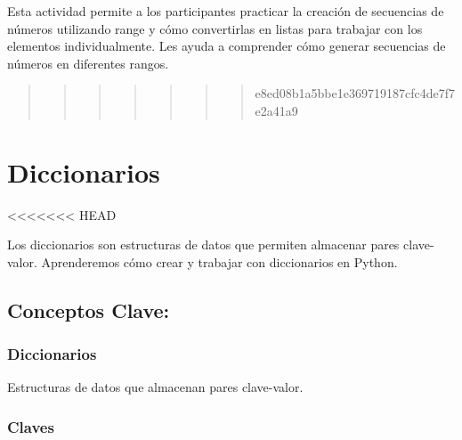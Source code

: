 \documentclass[
  a4paper,
  DIV=11,
  numbers=noendperiod,
  onepage,
  openany]{scrreprt}
\begin{document}
Esta actividad permite a los participantes practicar la creación de
secuencias de números utilizando range y cómo convertirlas en listas
para trabajar con los elementos individualmente. Les ayuda a comprender
cómo generar secuencias de números en diferentes rangos.

\begin{quote}
\begin{quote}
\begin{quote}
\begin{quote}
\begin{quote}
\begin{quote}
\begin{quote}
e8ed08b1a5bbe1e369719187cfc4de7f7e2a41a9
\end{quote}
\end{quote}
\end{quote}
\end{quote}
\end{quote}
\end{quote}
\end{quote}

\hypertarget{diccionarios}{%
\chapter{Diccionarios}\label{diccionarios}}

\textless\textless\textless\textless\textless\textless\textless{} HEAD

Los diccionarios son estructuras de datos que permiten almacenar pares
clave-valor. Aprenderemos cómo crear y trabajar con diccionarios en
Python.

\hypertarget{conceptos-clave-24}{%
\section{Conceptos Clave:}\label{conceptos-clave-24}}

\hypertarget{diccionarios-1}{%
\subsection{Diccionarios}\label{diccionarios-1}}

Estructuras de datos que almacenan pares clave-valor.

\hypertarget{claves}{%
\subsection{Claves}\label{claves}}
\end{document}
